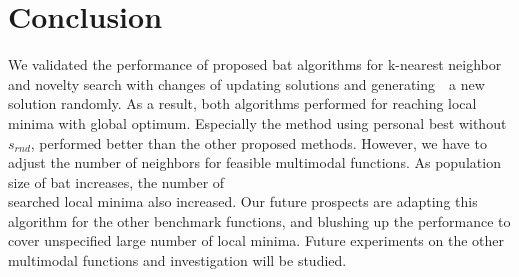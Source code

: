 

  
\section{Conclusion}
We validated the performance of proposed bat algorithms for k-nearest neighbor and novelty search with changes of updating solutions and generating　a new solution randomly. As a result, both algorithms performed for reaching local minima with global optimum. Especially the method using personal best without ${s_{rnd}}$, performed better than the other proposed methods. However, we have to adjust the number of neighbors for feasible multimodal functions. As population size of bat increases, the number of\\ searched local minima  also increased. Our future prospects are adapting this algorithm for the other benchmark functions, and blushing up the performance to cover unspecified large number of local minima. Future experiments on the other multimodal functions and investigation will be studied.




